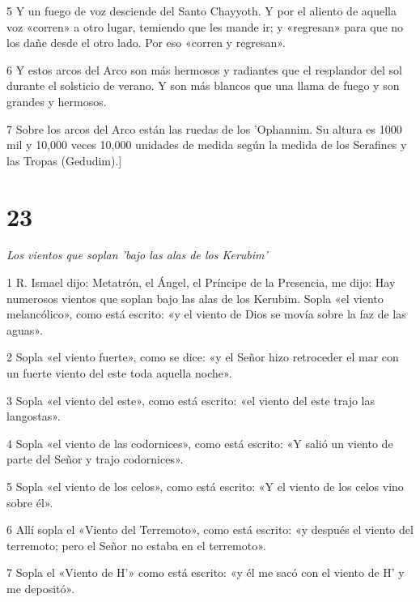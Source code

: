 \par 5 Y un fuego de voz desciende del Santo Chayyoth. Y por el aliento de aquella voz «corren» a otro lugar, temiendo que les mande ir; y «regresan» para que no los dañe desde el otro lado. Por eso «corren y regresan».

\par 6 Y estos arcos del Arco son más hermosos y radiantes que el resplandor del sol durante el solsticio de verano. Y son más blancos que una llama de fuego y son grandes y hermosos.

\par 7 Sobre los arcos del Arco están las ruedas de los 'Ophannim. Su altura es 1000 mil y 10,000 veces 10,000 unidades de medida según la medida de los Serafines y las Tropas (Gedudim).]

\chapter{23}

\par \textit{Los vientos que soplan 'bajo las alas de los Kerubim'}

\par 1 R. Ismael dijo: Metatrón, el Ángel, el Príncipe de la Presencia, me dijo: Hay numerosos vientos que soplan bajo las alas de los Kerubim. Sopla «el viento melancólico», como está escrito: «y el viento de Dios se movía sobre la faz de las aguas».

\par 2 Sopla «el viento fuerte», como se dice: «y el Señor hizo retroceder el mar con un fuerte viento del este toda aquella noche».

\par 3 Sopla «el viento del este», como está escrito: «el viento del este trajo las langostas».

\par 4 Sopla «el viento de las codornices», como está escrito: «Y salió un viento de parte del Señor y trajo codornices».

\par 5 Sopla «el viento de los celos», como está escrito: «Y el viento de los celos vino sobre él».

\par 6 Allí sopla el «Viento del Terremoto», como está escrito: «y después el viento del terremoto; pero el Señor no estaba en el terremoto».

\par 7 Sopla el «Viento de H'» como está escrito: «y él me sacó con el viento de H' y me depositó».

